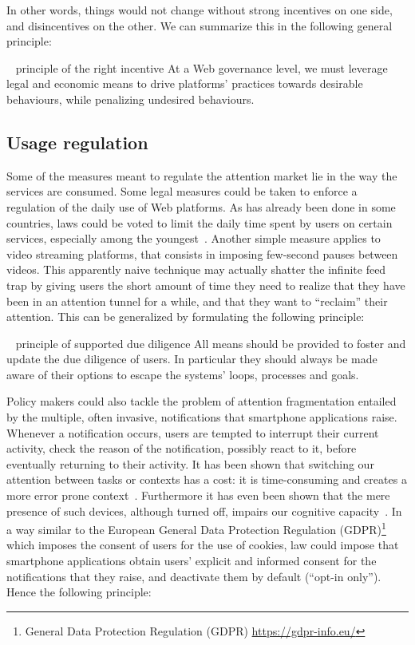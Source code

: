 \documentclass[10pt]{article}
\begin{document}
In other words, things would not change without strong incentives on one side, and disincentives on the other. We can summarize this in the following general principle:

\begin{principle}{\faThumbTack ~ principle of the right incentive}
At a Web governance level, we must leverage legal and economic means to 
drive platforms' practices
towards desirable behaviours, while penalizing undesired behaviours.
\end{principle}


\subsection{Usage regulation}
Some of the measures meant to regulate the attention market lie in the way the services are consumed.
Some legal measures could be taken to enforce a regulation of the daily use of Web platforms.
As has already been done in some countries, laws could be voted to limit the daily time spent by users on certain services, especially among the youngest~\cite{Kantrowitz_5_2021,carroll_much_2023}.
Another simple measure applies to video streaming platforms, that consists in imposing few-second pauses between videos. This apparently naive technique may actually shatter the infinite feed trap by giving users the short amount of time they need to realize that they have been in an attention tunnel for a while, and that they want to ``reclaim'' their attention.
This can be generalized by formulating the following principle:

\begin{principle}{\faThumbTack ~ principle of supported due diligence}
All means should be provided to foster and update the due diligence of users. In particular they should always be made aware of their options to escape the systems' loops, processes and goals.
\end{principle} 

Policy makers could also tackle the problem of attention fragmentation entailed by the multiple, often invasive, notifications that smartphone applications raise. Whenever a notification occurs, users are tempted to interrupt their current activity, check the reason of the notification, possibly react to it, before eventually returning to their activity.
It has been shown that switching our attention between tasks or contexts
has a cost: it is time-consuming and creates a more error prone context~\cite{jersild1927mental,monsell2003task,rogers1995costs}.
Furthermore it has even been shown that the mere presence of such devices, although turned off, impairs our cognitive capacity~\cite{ward2017brain}. 
In a way similar to the European General Data Protection Regulation (GDPR)\footnote{General Data Protection Regulation (GDPR) \url{https://gdpr-info.eu/}}
which imposes the consent of users for the use of cookies, law could impose that smartphone applications obtain users' explicit and informed consent for the notifications that they raise, and deactivate them by default (``opt-in only'').
Hence the following principle:
\end{document}
